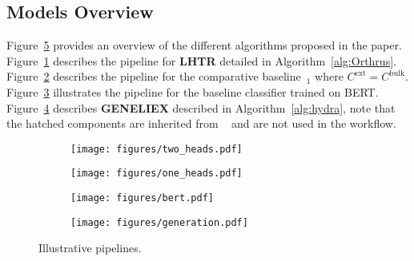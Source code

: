 \subsection{Models Overview}\label{sec:workflows} 
Figure~\ref{Fig:schema} provides an overview of the different algorithms proposed  in the paper. Figure~\ref{fig:two_heads} describes the pipeline for {\small\textbf{LHTR}} detailed in Algorithm~\ref{alg:Orthrus}. Figure~\ref{fig:one_head} describes the pipeline for the comparative baseline~\HTalgo$_1$  where $C^\text{ext} = C^\text{bulk}$. Figure~\ref{fig:baseline} illustrates the pipeline for the baseline classifier trained on BERT. Figure~\ref{fig:generation} describes  {\small\textbf{GENELIEX}} described in Algorithm~\ref{alg:hydra}, note that the hatched components are inherited from \HTalgo~ and are not used in the workflow.
\begin{figure}[h]{}
 \begin{subfigure}[t]{0.49\textwidth}
 \texttt{[image: figures/two\_heads.pdf]}
 \caption{}
   \label{fig:two_heads}
 \end{subfigure}
 \begin{subfigure}[t]{0.49\textwidth}
\texttt{[image: figures/one\_heads.pdf]}
   \caption{}
   \label{fig:one_head}
 \end{subfigure}
 \begin{subfigure}[t]{0.49\textwidth}
   \texttt{[image: figures/bert.pdf]}
   \caption{}
   \label{fig:baseline}
 \end{subfigure}
 \hfill
 \begin{subfigure}[t]{0.49\textwidth}
   \texttt{[image: figures/generation.pdf]}
   \caption{}
   \label{fig:generation}
 \end{subfigure}
 \caption{Illustrative pipelines.}
\label{Fig:schema}
 \end{figure}

